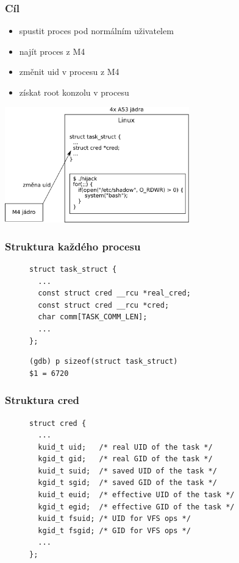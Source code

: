 \documentclass{beamer}
\begin{document}
\begin{frame}
\frametitle{Cíl}
\begin{itemize}
	\item spustit proces pod normálním uživatelem
	\item najít proces z M4
	\item změnit uid v procesu z M4
	\item získat root konzolu v procesu
\end{itemize}
\flushright
\includegraphics[width=8cm]{figures/goal.pdf}
\end{frame}

\begin{frame}[fragile]
\frametitle{Struktura každého procesu}
\begin{figure}
\begin{verbatim}
struct task_struct {
  ...
  const struct cred __rcu *real_cred;
  const struct cred __rcu *cred;
  char comm[TASK_COMM_LEN];
  ...
};
\end{verbatim}
\vspace{1cm}
\begin{verbatim}
(gdb) p sizeof(struct task_struct)
$1 = 6720
\end{verbatim}
\end{figure}
\end{frame}

\begin{frame}[fragile]
\frametitle{Struktura cred}
\begin{figure}
\begin{verbatim}
struct cred {
  ...
  kuid_t uid;   /* real UID of the task */
  kgid_t gid;   /* real GID of the task */
  kuid_t suid;  /* saved UID of the task */
  kgid_t sgid;  /* saved GID of the task */
  kuid_t euid;  /* effective UID of the task */
  kgid_t egid;  /* effective GID of the task */
  kuid_t fsuid; /* UID for VFS ops */
  kgid_t fsgid; /* GID for VFS ops */
  ...
};
\end{verbatim}
\end{figure}
\end{frame}
\end{document}
